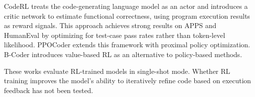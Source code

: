 
CodeRL \citep{le2022coderl} treats the code-generating language model as an actor and introduces a critic network to estimate functional correctness, using program execution results as reward signals. This approach achieves strong results on APPS and HumanEval by optimizing for test-case pass rates rather than token-level likelihood. PPOCoder \citep{shojaee2023ppocoder} extends this framework with proximal policy optimization. B-Coder \citep{yu2023bcoder} introduces value-based RL as an alternative to policy-based methods.

These works evaluate RL-trained models in single-shot mode. Whether RL training improves the model's ability to iteratively refine code based on execution feedback has not been tested.
